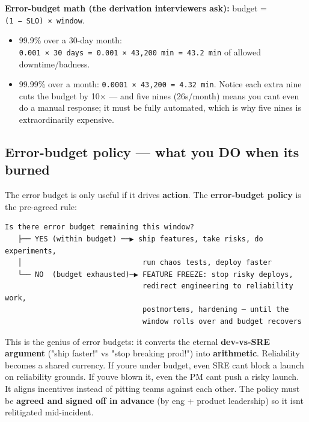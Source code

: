 \documentclass[11pt]{article}
\providecommand{\tightlist}{\setlength{\itemsep}{1pt}\setlength{\parskip}{0pt}}
\begin{document}
\textbf{Error-budget math (the derivation interviewers ask):} budget = \texttt{(1\ −\ SLO)\ ×\ window}.

\begin{itemize}
\tightlist
\item
  99.9\% over a 30-day month: \texttt{0.001\ ×\ 30\ days\ =\ 0.001\ ×\ 43,200\ min\ =\ 43.2\ min} of allowed downtime/badness.
\item
  99.99\% over a month: \texttt{0.0001\ ×\ 43,200\ =\ 4.32\ min}. Notice each extra nine cuts the budget by 10\(\times\) --- and five nines (26s/month) means you can\textquotesingle t even do a manual response; it must be fully automated, which is why five nines is extraordinarily expensive.
\end{itemize}

\subsection{Error-budget policy --- what you DO when it\textquotesingle s burned}\label{error-budget-policy--what-you-do-when-its-burned}

The error budget is only useful if it drives \textbf{action}. The \textbf{error-budget policy} is the pre-agreed rule:

\setcodelang{}

\begin{verbatim}
Is there error budget remaining this window?
   ├── YES (within budget) ──▶ ship features, take risks, do experiments,
   │                            run chaos tests, deploy faster
   └── NO  (budget exhausted)─▶ FEATURE FREEZE: stop risky deploys,
                                redirect engineering to reliability work,
                                postmortems, hardening — until the
                                window rolls over and budget recovers
\end{verbatim}

This is the genius of error budgets: it converts the eternal \textbf{dev-vs-SRE argument} ("ship faster!" vs "stop breaking prod!") into \textbf{arithmetic}. Reliability becomes a shared currency. If you\textquotesingle re under budget, even SRE can\textquotesingle t block a launch on reliability grounds. If you\textquotesingle ve blown it, even the PM can\textquotesingle t push a risky launch. It aligns incentives instead of pitting teams against each other. The policy must be \textbf{agreed and signed off in advance} (by eng + product leadership) so it isn\textquotesingle t relitigated mid-incident.
\end{document}
